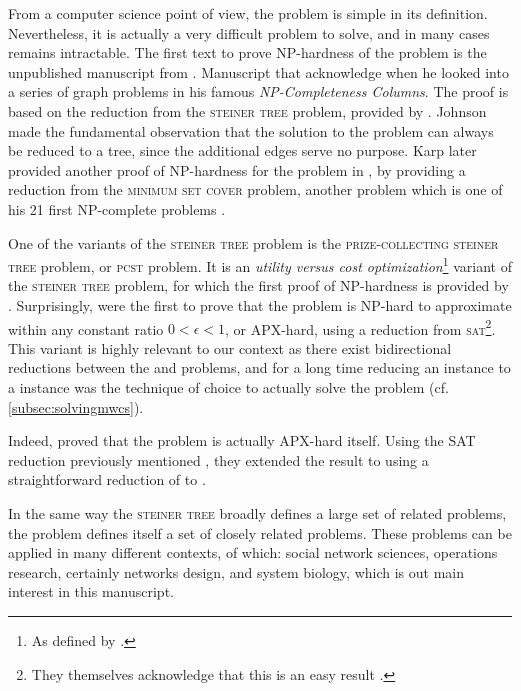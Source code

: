 	From a computer science point of view, the \mwcs{} problem is simple in its definition.
	Nevertheless, it is actually a very difficult problem to solve, and in many cases remains intractable.
	The first text to prove NP-hardness of the problem is the unpublished manuscript from \textcite{vergis1983manuscript}.
	Manuscript that \textcite[Section 5]{johnson1985np} acknowledge when he looked into a series of graph problems in his famous \emph{NP-Completeness Columns}.
	The proof is based on the reduction from the \textsc{steiner tree} problem, provided by \textcite{garey1979computers}.
	Johnson made the fundamental observation that the solution to the \mwcs{} problem can always be reduced to a tree, since the additional edges serve no purpose.
	Karp later provided another proof of NP-hardness for the \mwcs{} problem in \parencite[Supplementary Material]{ideker2002discovering}, by providing a reduction from the \textsc{minimum set cover} problem, another problem which is one of his 21 first NP-complete problems \parencite{karp1972reducibility}.

	One of the variants of the \textsc{steiner tree} problem is the \textsc{prize-collecting steiner tree} problem, or \textsc{pcst} problem.
	It is an \emph{utility versus cost optimization}\footnote{As defined by \textcite{conrad2007connections}.} variant of the \textsc{steiner tree} problem, for which the first proof of NP-hardness is provided by \textcite{camerini1979complexity}.
	Surprisingly, \textcite{feigenbaum2000sharing} were the first to prove that the \pcst{} problem is NP-hard to approximate within any constant ratio $0 < \epsilon < 1$, or APX-hard, using a reduction from \textsc{sat}\footnote{They themselves acknowledge that this is an easy result \parencite[footnote 12]{feigenbaum2000sharing}.}.
	This variant is highly relevant to our context as there exist bidirectional reductions between the \pcst{} and \mwcs{} problems, and for a long time reducing an \mwcs{} instance to a \pcst{} instance was the technique of choice to actually solve the problem (cf. \cref{subsec:solvingmwcs}).

	Indeed, \textcite{alvarez2013maximum} proved that the \mwcs{} problem is actually APX-hard itself.
	Using the SAT reduction previously mentioned \parencite{feigenbaum2000sharing}, they extended the result to \mwcs{} using a straightforward reduction of \pcst{} to \mwcs{}.

	In the same way the \textsc{steiner tree} broadly defines a large set of related problems, the \mwcs{} problem defines itself a set of closely related problems.
	These problems can be applied in many different contexts, of which: social network sciences, operations research, certainly networks design, and system biology, which is out main interest in this manuscript.

